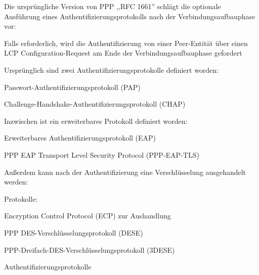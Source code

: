 \documentclass[a4paper]{article}
\begin{document}
\begin{multicols}{3}
      \begin{itemize*}
            \item Die ursprüngliche Version von PPP ,,RFC 1661'' schlägt die optionale
            Ausführung eines Authentifizierungsprotokolls nach der
            Verbindungsaufbauphase vor:
            \begin{itemize*}
                  \item Falls erforderlich, wird die Authentifizierung von einer Peer-Entität über einen LCP Configuration-Request am Ende der Verbindungsaufbauphase gefordert
                  \item Ursprünglich sind zwei Authentifizierungsprotokolle definiert worden:
                  \begin{itemize*} \item Passwort-Authentifizierungsprotokoll (PAP) \item Challenge-Handshake-Authentifizierungsprotokoll (CHAP) \end{itemize*}
                  \item Inzwischen ist ein erweiterbares Protokoll definiert worden:
                  \begin{itemize*} \item Erweiterbares Authentifizierungsprotokoll (EAP) \item PPP EAP Transport Level Security Protocol (PPP-EAP-TLS) \end{itemize*}
            \end{itemize*}
            \item Außerdem kann nach der Authentifizierung eine Verschlüsselung
            ausgehandelt werden:
            \begin{itemize*}
                  \item Protokolle:
                  \begin{itemize*} \item Encryption Control Protocol (ECP) zur Aushandlung \item PPP DES-Verschlüsselungsprotokoll (DESE) \item PPP-Dreifach-DES-Verschlüsselungsprotokoll (3DESE) \end{itemize*}
            \end{itemize*}
      \end{itemize*}

      Authentifizierungsprotokolle


\end{multicols}
\end{document}
